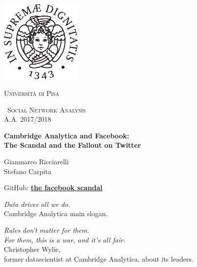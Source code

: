 \begin{titlepage}
    \centering
    \includegraphics[width=0.30\textwidth]{images/cherubino_black.pdf}\par\vspace{1cm}
    {\scshape\LARGE Università di Pisa \par}
    \vspace{1cm}
    {\scshape\ Social Network Analysis \\A.A. 2017/2018\par}
    \vspace{1.5cm}
    {\huge\bfseries Cambridge Analytica and Facebook: \\ The Scandal and the Fallout on Twitter\\ \par}
    \vspace{2cm}
    {\Large Gianmarco Ricciarelli \\ Stefano Carpita \par}
    \vspace{2cm}
    {\Large GitHub: \href{https://github.com/germz01/the_facebook_scandal}{\textbf{the facebook scandal}} \par}
    \vfill

\begin{flushright}
  \textit{Data drives all we do.}\\
\vspace{2 mm}
Cambridge Analytica main slogan.
\end{flushright}

\vspace{4 mm}

\begin{flushright}
  \textit{Rules don’t matter for them. \\ For them, this is a war, and it’s all fair.}\\
\vspace{2 mm}
  Christopher Wylie, \\ former datascientist at Cambridge Analytica, about its leaders.
\end{flushright}




  \end{titlepage}

